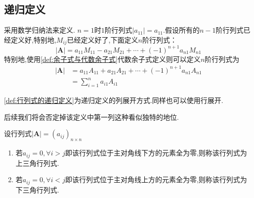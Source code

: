 \subsection{递归定义}
\begin{formal}
\begin{definition}[行列式的递归定义]\label{def:行列式的递归定义}
    采用数学归纳法来定义.
    $n=1$时$1$阶行列式$\left|a_{11}\right|=a_{11}.$假设所有的$n-1$阶行列式已经定义好,特别地,$M_{ij}$已经定义好了,下面定义$n$阶行列式：
    \[
    \left|\bm{A}\right|=a_{11}M_{11}-a_{21}M_{21}+\cdots+(-1)^{n+1}a_{n1}M_{n1}
    \]
    特别地,使用\cref{def:余子式与代数余子式}代数余子式定义则可以定义$n$阶行列式为
    \begin{align*}
         \left|\bm{A}\right|&=a_{11}A_{11}+a_{21}A_{21}+\cdots+(-1)^{n+1}a_{n1}A_{n1}\\
         &=\sum_{i=1}^{n}a_{i1}A_{i1}
    \end{align*}
\end{definition}
\end{formal}
\vfill
\begin{red}
    \begin{remark}
        \cref{def:行列式的递归定义}为递归定义的列展开方式.同样也可以使用行展开.
        
        后续我们将会否定掉该定义中第一列这种看似独特的地位.
    \end{remark}
\end{red}
\begin{formal}
\begin{definition}[三角行列式]\label{def:三角行列式}
设行列式$\left|\bm{A}\right|=\left(a_{ij}\right)_{n\times n}$
    \begin{enumerate}[label = {\textup{(\arabic*)}}]
        \item 若$a_{ij}=0,\forall i>j$即该行列式位于主对角线下方的元素全为零,则称该行列式为上三角行列式.
        \item 若$a_{ij}=0,\forall i<j$即该行列式位于主对角线上方的元素全为零,则称该行列式为下三角行列式.
    \end{enumerate}
\end{definition}
\end{formal}

